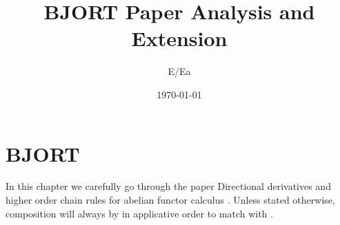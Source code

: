 \documentclass[12pt]{book}
\begin{document}


\title{BJORT Paper Analysis and Extension}
\author{E/Ea}
\date{\today}



\maketitle

\tableofcontents



% 



% 


% 



% 


\chapter{BJORT}

\newcommand{\crn}{\text{cr}}
\newcommand{\invbn}{\text{!`}}

In this chapter we carefully go through the paper Directional derivatives and higher order chain rules for abelian functor calculus \cite{BJORT}. Unless stated otherwise, composition will always by in applicative order to match with \cite{BJORT}.


\end{document}
